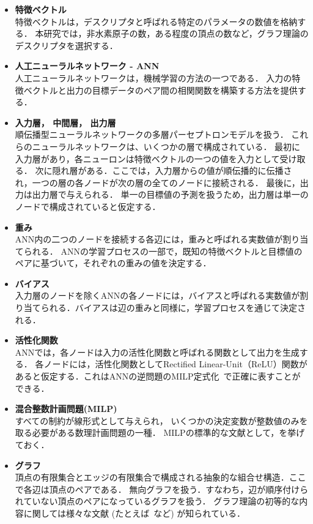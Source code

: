 \documentclass[11pt,titlepage,dvipdfmx,twoside]{jsbook}
\newcommand{\target}{目標}
\begin{document}
\begin{itemize}

\item {\bf 特徴ベクトル}\\
%
特徴ベクトルは，デスクリプタと呼ばれる特定のパラメータの数値を格納する．
本研究では，非水素原子の数，ある程度の頂点の数など，グラフ理論のデスクリプタを選択する．

\item {\bf 人工ニューラルネットワーク - ANN}\\
%
人工ニューラルネットワークは，機械学習の方法の一つである．
入力の特徴ベクトルと出力の\target データのペア間の相関関数を構築する方法を提供する．


\item {\bf 入力層， 中間層， 出力層}\\
%
順伝播型ニューラルネットワークの多層パーセプトロンモデルを扱う．
これらのニューラルネットワークは、いくつかの層で構成されている．
最初に入力層があり，各ニューロンは特徴ベクトルの一つの値を入力として受け取る．
次に隠れ層がある．ここでは，入力層からの値が順伝播的に伝播され，一つの層の各ノードが次の層の全てのノードに接続される．
最後に，出力は出力層で与えられる．
単一の\target 値の予測を扱うため，出力層は単一のノードで構成されていると仮定する．

\item {\bf 重み}\\
%
ANN内の二つのノードを接続する各辺には，重みと呼ばれる実数値が割り当てられる．
ANNの学習プロセスの一部で，既知の特徴ベクトルと\target 値のペアに基づいて，それぞれの重みの値を決定する．

\item {\bf バイアス}\\
入力層のノードを除くANNの各ノードには，バイアスと呼ばれる実数値が割り当てられる．バイアスは辺の重みと同様に，学習プロセスを通じて決定される．


\item {\bf 活性化関数}\\
%
ANNでは，各ノードは入力の活性化関数と呼ばれる関数として出力を生成する．
各ノードには，活性化関数としてRectified Linear-Unit（ReLU）関数があると仮定する．これはANNの逆問題のMILP定式化~\cite{AN19}で正確に表すことができる．

\item {\bf 混合整数計画問題(MILP)}\\
%
すべての制約が線形式として与えられ，
いくつかの決定変数が整数値のみを取る必要がある数理計画問題の一種．
MILPの標準的な文献として，\cite{LP}を挙げておく． 

\item {\bf グラフ}\\
頂点の有限集合とエッジの有限集合で構成される抽象的な組合せ構造．ここで各辺は頂点のペアである．
無向グラフを扱う．すなわち，辺が順序付けられていない頂点のペアになっているグラフを扱う．
グラフ理論の初等的な内容に関しては様々な文献 (たとえば~\cite{graph}など) が知られている．

\end{itemize}
\end{document}
